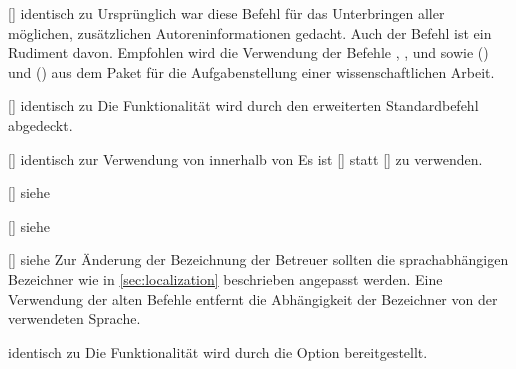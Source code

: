 \begin{Bundle*}{}
\begin{Declaration}{[]}{%
  identisch zu %
}
\printdeclarationlist%
%
Ursprünglich war diese Befehl für das Unterbringen aller möglichen, 
zusätzlichen Autoreninformationen gedacht. Auch der Befehl  
ist ein Rudiment davon. Empfohlen wird die Verwendung der Befehle 
, ,  und 
 sowie () 
und () aus dem Paket 
 für die Aufgabenstellung einer wissenschaftlichen 
Arbeit.
\end{Declaration}

\begin{Declaration}{[]}{%
  identisch zu %
}
\printdeclarationlist%
%
Die Funktionalität wird durch den erweiterten Standardbefehl  
abgedeckt.
\end{Declaration}

\begin{Declaration}{[]}{%
  identisch zur Verwendung von  innerhalb von %
}
\printdeclarationlist%
%
Es ist []
statt [] zu verwenden.
\end{Declaration}

\begin{Declaration}{[]}{%
  siehe %
}
\begin{Declaration}{[]}{%
  siehe %
}
\begin{Declaration}{[]}{%
  siehe %
}
\printdeclarationlist%
%
Zur Änderung der Bezeichnung der Betreuer sollten die sprachabhängigen 
Bezeichner wie in \autoref{sec:localization} beschrieben angepasst werden. Eine 
Verwendung der alten Befehle entfernt die Abhängigkeit der Bezeichner von der 
verwendeten Sprache.
\end{Declaration}
\end{Declaration}
\end{Declaration}

\begin{Declaration}{}{%
  identisch zu %
}
\printdeclarationlist%
%
Die Funktionalität wird durch die Option  bereitgestellt.
\end{Declaration}


\end{Bundle*}
